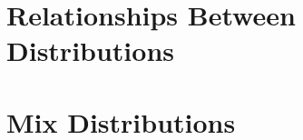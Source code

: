 \clearpage


\clearpage








\chapter{Relationships Between Distributions}









\chapter{Mix Distributions}







